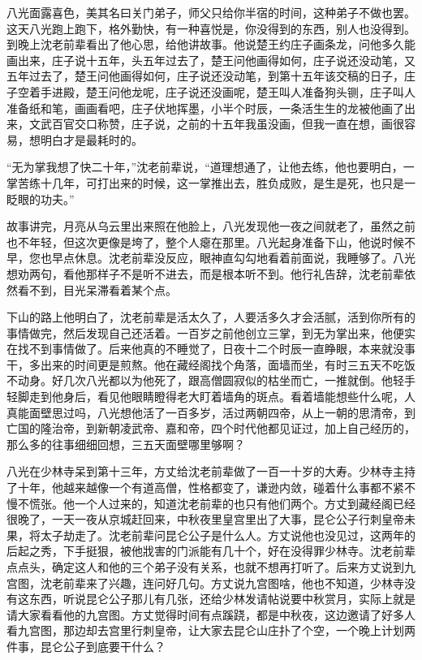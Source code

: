 八光面露喜色，美其名曰关门弟子，师父只给你半宿的时间，这种弟子不做也罢。这天八光跑上跑下，格外勤快，有一种喜悦是，你没得到的东西，别人也没得到。到晚上沈老前辈看出了他心思，给他讲故事。他说楚王约庄子画条龙，问他多久能画出来，庄子说十五年，头五年过去了，楚王问他画得如何，庄子说还没动笔，又五年过去了，楚王问他画得如何，庄子说还没动笔，到第十五年该交稿的日子，庄子空着手进殿，楚王问他龙呢，庄子说还没画呢，楚王叫人准备狗头铡，庄子叫人准备纸和笔，画画看吧，庄子伏地挥墨，小半个时辰，一条活生生的龙被他画了出来，文武百官交口称赞，庄子说，之前的十五年我虽没画，但我一直在想，画很容易，想明白才是最耗时的。

“无为掌我想了快二十年，”沈老前辈说，“道理想通了，让他去练，他也要明白，一掌苦练十几年，可打出来的时候，这一掌推出去，胜负成败，是生是死，也只是一眨眼的功夫。”

故事讲完，月亮从乌云里出来照在他脸上，八光发现他一夜之间就老了，虽然之前也不年轻，但这次更像是垮了，整个人瘪在那里。八光起身准备下山，他说时候不早，您也早点休息。沈老前辈没反应，眼神直勾勾地看着前面说，我睡够了。八光想劝两句，看他那样子不是听不进去，而是根本听不到。他行礼告辞，沈老前辈依然看不到，目光呆滞看着某个点。

下山的路上他明白了，沈老前辈是活太久了，人要活多久才会活腻，活到你所有的事情做完，然后发现自己还活着。一百岁之前他创立三掌，到无为掌出来，他便实在找不到事情做了。后来他真的不睡觉了，日夜十二个时辰一直睁眼，本来就没事干，多出来的时间更是煎熬。他在藏经阁找个角落，面墙而坐，有时三五天不吃饭不动身。好几次八光都以为他死了，跟高僧圆寂似的枯坐而亡，一推就倒。他轻手轻脚走到他身后，看见他眼睛瞪得老大盯着墙角的斑点。看着墙能想些什么呢，人真能面壁思过吗，八光想他活了一百多岁，活过两朝四帝，从上一朝的思清帝，到亡国的隆治帝，到新朝凌武帝、嘉和帝，四个时代他都见证过，加上自己经历的，那么多的往事细细回想，三五天面壁哪里够啊？

八光在少林寺呆到第十三年，方丈给沈老前辈做了一百一十岁的大寿。少林寺主持了十年，他越来越像一个有道高僧，性格都变了，谦逊内敛，碰着什么事都不紧不慢不慌张。他一个人过来的，知道沈老前辈的也只有他们两个。方丈到藏经阁已经很晚了，一天一夜从京城赶回来，中秋夜里皇宫里出了大事，昆仑公子行刺皇帝未果，将太子劫走了。沈老前辈问昆仑公子是什么人。方丈说他也没见过，这两年的后起之秀，下手挺狠，被他戕害的门派能有几十个，好在没得罪少林寺。沈老前辈点点头，确定这人和他的三个弟子没有关系，也就不想再打听了。后来方丈说到九宫图，沈老前辈来了兴趣，连问好几句。方丈说九宫图啥，他也不知道，少林寺没有这东西，听说昆仑公子那儿有几张，还给少林发请帖说要中秋赏月，实际上就是请大家看看他的九宫图。方丈觉得时间有点蹊跷，都是中秋夜，这边邀请了好多人看九宫图，那边却去宫里行刺皇帝，让大家去昆仑山庄扑了个空，一个晚上计划两件事，昆仑公子到底要干什么？

